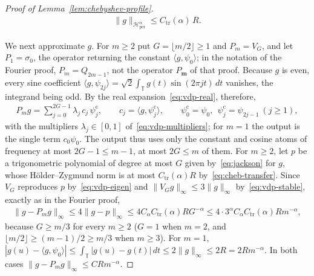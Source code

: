 \begin{proof}[Proof of Lemma~\ref{lem:chebyshev-profile}]
\begin{align}
\|g\|_{\mathcal H^\alpha_{\mathrm{per}}}\leq C_{\mathrm{tr}}(\alpha)\,R .
\label{eq:cheb-transfer}
\end{align}

We next approximate $g$. For $m\geq2$ put $G=\lfloor m/2\rfloor\geq1$ and $P_m=V_G$, and let $P_1=\sigma_0$, the operator returning the constant $\langle g,\psi_0\rangle$; in the notation of the Fourier proof, $P_m=Q_{2m-1}$, not the operator $P_{\boldsymbol m}$ of that proof. Because $g$ is even, every sine coefficient $\langle g,\psi_{2j}\rangle=\sqrt2\int_{\mathbb T}g(t)\sin(2\pi jt)\,dt$ vanishes, the integrand being odd. By the real expansion~\eqref{eq:vdp-real}, therefore,
\begin{align*}
P_mg=\sum_{j=0}^{2G-1}\lambda_j\,c_j\,\psi^{\mathrm c}_j,
\qquad
c_j=\langle g,\psi^{\mathrm c}_j\rangle,
\qquad
\psi^{\mathrm c}_0=\psi_0,\ \ \psi^{\mathrm c}_j=\psi_{2j-1}\ (j\geq1),
\end{align*}
with the multipliers $\lambda_j\in[0,1]$ of~\eqref{eq:vdp-multipliers}; for $m=1$ the output is the single term $c_0\psi_0$. The output thus uses only the constant and cosine atoms of frequency at most $2G-1\leq m-1$, at most $2G\leq m$ of them. For $m\geq2$, let $p$ be a trigonometric polynomial of degree at most $G$ given by~\eqref{eq:jackson} for $g$, whose H\"older--Zygmund norm is at most $C_{\mathrm{tr}}(\alpha)R$ by~\eqref{eq:cheb-transfer}. Since $V_G$ reproduces $p$ by~\eqref{eq:vdp-eigen} and $\|V_Gg\|_\infty\leq3\|g\|_\infty$ by~\eqref{eq:vdp-stable}, exactly as in the Fourier proof,
\begin{align*}
\|g-P_mg\|_\infty\leq4\|g-p\|_\infty\leq4C_\alpha C_{\mathrm{tr}}(\alpha)RG^{-\alpha}\leq4\cdot3^\alpha C_\alpha C_{\mathrm{tr}}(\alpha)Rm^{-\alpha},
\end{align*}
because $G\geq m/3$ for every $m\geq2$ ($G=1$ when $m=2$, and $\lfloor m/2\rfloor\geq(m-1)/2\geq m/3$ when $m\geq3$). For $m=1$, $|g(u)-\langle g,\psi_0\rangle|\leq\int_{\mathbb T}|g(u)-g(t)|\,dt\leq2\|g\|_\infty\leq2R=2Rm^{-\alpha}$. In both cases $\|g-P_mg\|_\infty\leq CRm^{-\alpha}$.


\end{proof}
